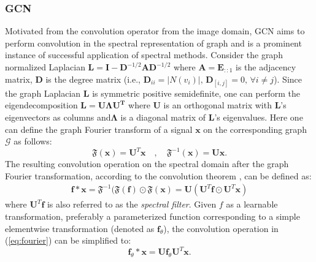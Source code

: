 \subsubsection{GCN \citep{kipfSemiSupervisedClassificationGraph2017}} Motivated
from the convolution operator from the image domain, GCN aims to perform
convolution in the spectral representation of graph and is a prominent instance
of successful application of spectral methods. Consider the graph normalized
Laplacian $\mathbf{L} = \mathbf{I}-\mathbf{D}^{-1/2}\mathbf{A}\mathbf{D}^{-1/2}$
where $\mathbf{A} = \mathbf{E}_{::1}$ is the adjacency matrix, $\mathbf{D}$ is
the degree matrix (i.e., $\mathbf{D}_{ii} = |N(v_i)|,\, \mathbf{D}_{[i,j]} =
0,\, \forall i \neq j$). Since the graph Laplacian $\mathbf{L}$ is symmetric
positive semidefinite, one can perform the eigendecomposition $\mathbf{L} =
\mathbf{U\Lambda U^T}$ where $\mathbf{U}$ is an orthogonal matrix with
$\mathbf{L}$'s eigenvectors as columns and$\mathbf{\Lambda}$ is a diagonal
matrix of $\mathbf{L}$'s eigenvalues. Here one can define the graph Fourier
transform of a signal $\mathbf{x}$ on the corresponding graph $\mathcal{G}$ as
follows: $$ \mathfrak{F}(\mathbf{x}) = \mathbf{U}^T \mathbf{x} \quad , \quad
\mathfrak{F}^{-1}(\mathbf{x}) = \mathbf{U} \mathbf{x} .$$ The resulting
convolution operation on the spectral domain after the graph Fourier
transformation, according to the convolution theorem
\citep{mallatWaveletTourSignal1999}, can be defined as: \begin{align}
  \label{eq:fourier} \mathbf{f} * \mathbf{x} =
  \mathfrak{F}^{-1}(\mathfrak{F}(\mathbf{f}) \odot \mathfrak{F}(\mathbf{x}) =
  \mathbf{U}(\mathbf{U}^T \mathbf{f} \odot \mathbf{U}^T \mathbf{x}) \end{align}
  where $\mathbf{U}^T \mathbf{f}$ is also referred to as the \textit{spectral
  filter}. Given $f$ as a learnable transformation, preferably a parameterized
  function corresponding to a simple elementwise transformation (denoted as
  $\mathbf{f}_{\theta}$), the convolution operation in (\ref{eq:fourier}) can be
  simplified to: $$ \mathbf{f}_{\theta} * \mathbf{x} = \mathbf{Uf}_{\theta}
  \mathbf{U}^T \mathbf{x} .$$


